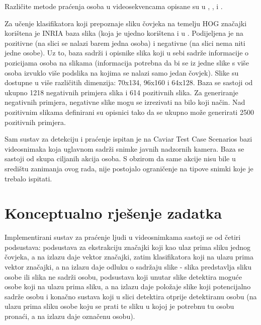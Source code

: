 \documentclass[utf8, seminar, numeric, times]{fer}
\begin{document}
Različite metode praćenja osoba u videosekvencama opisane su u \cite{object}, \cite{realtime}, \cite{efficient} i \cite{fast-accurate}.

Za učenje klasifikatora koji prepoznaje sliku čovjeka na temelju HOG značajki korištena je INRIA baza slika (koja je ujedno korištena i u \cite{hog}. Podijeljena je na pozitivne (na slici se nalazi barem jedna osoba) i negativne (na slici nema niti jedne osobe). Uz to, baza sadrži i opisnike slika koji u sebi sadrže informacije o pozicijama osoba na slikama (informacija potrebna da bi se iz jedne slike s više osoba izvuklo više podslika na kojima se nalazi samo jedan čovjek). Slike su dostupne u više različitih dimenzija: 70x134, 96x160 i 64x128. Baza se sastoji od ukupno 1218 negativnih primjera slika i 614 pozitivnih slika. Za generiranje negativnih primjera, negativne slike mogu se izrezivati na bilo koji način. Nad pozitivnim slikama definirani su opisnici tako da se ukupno može generirati 2500 pozitivnih primjera.

Sam sustav za detekciju i praćenje ispitan je na Caviar Test Case Scenarios bazi videosnimaka koja uglavnom sadrži snimke javnih nadzornih kamera. Baza se sastoji od skupa ciljanih akcija osoba. S obzirom da same akcije nisu bile u središtu zanimanja ovog rada, nije postojalo ograničenje na tipove snimki koje je trebalo ispitati.

\section{Konceptualno rješenje zadatka}
Implementirani sustav za praćenje ljudi u videosnimkama sastoji se od četiri podsustava: podsustava za ekstrakciju značajki koji kao ulaz prima sliku jednog čovjeka, a na izlazu daje vektor značajki, zatim klasifikatora koji  na ulazu prima vektor značajki, a na izlazu daje odluku o sadržaju slike - slika predstavlja sliku osobe ili slika ne sadrži osobu, podsustava koji unutar slike detektira moguće osobe koji na ulazu prima sliku, a na izlazu daje položaje slike koji potencijalno sadrže osobu i konačno sustava koji u slici detektira otprije detektiranu osobu (na ulazu prima sliku osobe koju se prati te sliku u kojoj je potrebnu tu osobu pronaći, a na izlazu daje označenu osobu).
\end{document}
